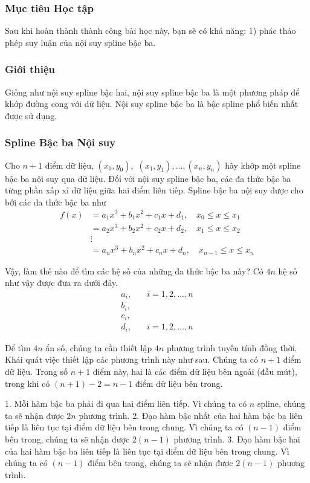 \subsubsection{Mục tiêu Học tập}
Sau khi hoàn thành thành công bài học này, bạn sẽ có khả năng:
1) phác thảo phép suy luận của nội suy spline bậc ba.

\subsubsection{Giới thiệu}
Giống như nội suy spline bậc hai, nội suy spline bậc ba là một phương pháp để khớp đường cong với dữ liệu. Nội suy spline bậc ba là bậc spline phổ biến nhất được sử dụng.

\subsubsection{Spline Bậc ba Nội suy}
Cho $n+1$ điểm dữ liệu, $(x_{0},y_{0}),$ $(x_{1},y_{1}),...,(x_{n},y_{n})$ hãy khớp một spline bậc ba nội suy qua dữ liệu. Đối với nội suy spline bậc ba, các đa thức bậc ba từng phần xấp xỉ dữ liệu giữa hai điểm liên tiếp. Spline bậc ba nội suy được cho bởi các đa thức bậc ba như
\begin{align}
f(x) &= a_1x^3 + b_1x^2 + c_1x + d_1, \quad x_0 \le x \le x_1 \nonumber \\
&= a_2x^3 + b_2x^2 + c_2x + d_2, \quad x_1 \le x \le x_2 \\
&\vdots \nonumber \\
&= a_nx^3 + b_nx^2 + c_nx + d_n, \quad x_{n-1} \le x \le x_n \nonumber
\end{align}

Vậy, làm thế nào để tìm các hệ số của những đa thức bậc ba này? Có $4n$ hệ số như vậy được đưa ra dưới đây.
\begin{align}
a_i, \quad & i=1,2,...,n \nonumber \\
b_i, \quad & \nonumber \\
c_i, \quad & \nonumber \\
d_i, \quad & i=1,2,...,n
\end{align}

Để tìm $4n$ ẩn số, chúng ta cần thiết lập $4n$ phương trình tuyến tính đồng thời. Khái quát việc thiết lập các phương trình này như sau.
Chúng ta có $n+1$ điểm dữ liệu. Trong số $n+1$ điểm này, hai là các điểm dữ liệu bên ngoài (đầu mút), trong khi có $(n+1)-2=n-1$ điểm dữ liệu bên trong.

1. Mỗi hàm bậc ba phải đi qua hai điểm liên tiếp. Vì chúng ta có $n$ spline, chúng ta sẽ nhận được $2n$ phương trình.
2. Đạo hàm bậc nhất của hai hàm bậc ba liên tiếp là liên tục tại điểm dữ liệu bên trong chung. Vì chúng ta có $(n-1)$ điểm bên trong, chúng ta sẽ nhận được $2(n-1)$ phương trình.
3. Đạo hàm bậc hai của hai hàm bậc ba liên tiếp là liên tục tại điểm dữ liệu bên trong chung. Vì chúng ta có $(n-1)$ điểm bên trong, chúng ta sẽ nhận được $2(n-1)$ phương trình.

